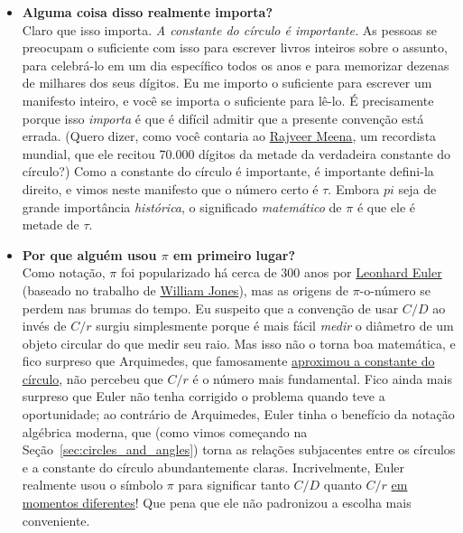 {\begin{itemize}
  \item \textbf{Alguma coisa disso realmente importa?} \\ Claro que isso importa. \emph{A constante do círculo é importante.} As pessoas se preocupam o suficiente com isso para escrever livros inteiros sobre o assunto, para celebrá-lo em um dia específico todos os anos e para memorizar dezenas de milhares dos seus dígitos. Eu me importo o suficiente para escrever um manifesto inteiro, e você se importa o suficiente para lê-lo. É precisamente porque isso \emph{importa} é que é difícil admitir que a presente convenção está errada. (Quero dizer, como você contaria ao \href{https://www.guinnessworldrecords.com/world-records/most-pi-places-memorised}{Rajveer Meena}, um recordista mundial, que ele recitou 70.000 dígitos da metade da verdadeira constante do círculo?) Como a constante do círculo é importante, é importante defini-la direito, e vimos neste manifesto que o número certo é $\tau$. Embora $pi$ seja de grande importância \emph{histórica}, o significado \emph{matemático} de $\pi$ é que ele é metade de $\tau$.

  \item \textbf{Por que alguém usou $\pi$ em primeiro lugar?} \\ Como notação, $\pi$ foi popularizado há cerca de 300 anos por \href{https://pt.wikipedia.org/wiki/Leonhard_Euler}{Leonhard Euler} (baseado no trabalho de \href{https://pt.wikipedia.org/wiki/William_Jones_(matem%C3%A1tico)}{William Jones}), mas as origens de $\pi$-o-número se perdem nas brumas do tempo. Eu suspeito que a convenção de usar $C/D$ ao invés de $C/r$ surgiu simplesmente porque é mais fácil \emph{medir} o diâmetro de um objeto circular do que medir seu raio. Mas isso não o torna boa matemática, e fico surpreso que Arquimedes, que famosamente \href{http://itech.fgcu.edu/faculty/clindsey/mhf4404/archimedes/archimedes.html}{aproximou a constante do círculo}, não percebeu que $C/r$ é o número mais fundamental. Fico ainda mais surpreso que Euler não tenha corrigido o problema quando teve a oportunidade; ao contrário de Arquimedes, Euler tinha o benefício da notação algébrica moderna, que (como vimos começando na Seção~\ref{sec:circles_and_angles}) torna as relações subjacentes entre os círculos e a constante do círculo abundantemente claras. Incrivelmente, Euler realmente usou o símbolo $\pi$ para significar tanto $C/D$ quanto $C/r$ \href{https://en.wikipedia.org/wiki/Pi#Adoption_of_the_symbol_%CF%80}{em momentos diferentes}! Que pena que ele não padronizou a escolha mais conveniente.


\end{itemize}}
